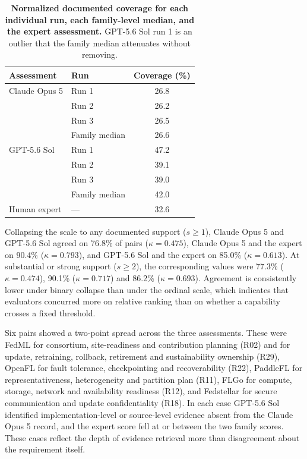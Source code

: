 \documentclass[10pt,a4paper]{article}
\begin{document}
\begin{table}[h]
\centering
\caption{\textbf{Normalized documented coverage for each individual run, each
family-level median, and the expert assessment.} GPT-5.6 Sol run 1 is an outlier that
the family median attenuates without removing.}
\label{tab:runs}
\footnotesize
\begin{tabular}{@{}llc@{}}
\toprule
\textbf{Assessment} & \textbf{Run} & \textbf{Coverage (\%)}\\
\midrule
Claude Opus 5 & Run 1 & 26.8\\
 & Run 2 & 26.2\\
 & Run 3 & 26.5\\
 & Family median & 26.6\\
\addlinespace
GPT-5.6 Sol & Run 1 & 47.2\\
 & Run 2 & 39.1\\
 & Run 3 & 39.0\\
 & Family median & 42.0\\
\addlinespace
Human expert & --- & 32.6\\
\bottomrule
\end{tabular}
\end{table}

Collapsing the scale to any documented support ($s \geq 1$), Claude Opus 5 and
GPT-5.6 Sol agreed on 76.8\% of pairs ($\kappa = 0.475$), Claude Opus 5 and the
expert on 90.4\% ($\kappa = 0.793$), and GPT-5.6 Sol and the expert on 85.0\%
($\kappa = 0.613$). At substantial or strong support ($s \geq 2$), the corresponding
values were 77.3\% ($\kappa = 0.474$), 90.1\% ($\kappa = 0.717$) and 86.2\%
($\kappa = 0.693$). Agreement is consistently lower under binary collapse than under
the ordinal scale, which indicates that evaluators concurred more on relative ranking
than on whether a capability crosses a fixed threshold.

Six pairs showed a two-point spread across the three assessments. These were FedML for
consortium, site-readiness and contribution planning (R02) and for update, retraining,
rollback, retirement and sustainability ownership (R29), OpenFL for fault tolerance,
checkpointing and recoverability (R22), PaddleFL for representativeness, heterogeneity
and partition plan (R11), FLGo for compute, storage, network and availability
readiness (R12), and Fedstellar for secure communication and update confidentiality
(R18). In each case GPT-5.6 Sol identified implementation-level or source-level
evidence absent from the Claude Opus 5 record, and the expert score fell at or between
the two family scores. These cases reflect the depth of evidence retrieval more than
disagreement about the requirement itself.
\end{document}

